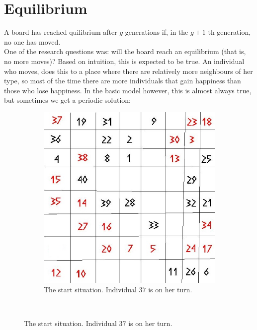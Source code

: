 
\section{Equilibrium}
 A board has reached quilibrium after $g$ generations if, in the $g+1$-th generation, no one has moved.\\
One of the research questions was: will the board reach an equilibrium (that is, no more moves)? Based on intuition, this is expected to be true. An individual who moves, does this to a place where there are relatively more neighbours of her type, so most of the time there are more individuals that gain happiness than those who lose happiness. In the basic model however, this is almost always true, but sometimes we get a periodic solution:\\

\begin{figure}[H]
    \centering
    \begin{subfigure}{0.3\textwidth}
        \includegraphics[width=\textwidth]{Tegenvoorbeeld/segregation_tegenvb.jpg}
        \caption{The start situation. Individual $37$ is on her turn.}
        \label{fig:movement1}
    \end{subfigure}\hspace{1cm}
    ~ %

\end{figure}
